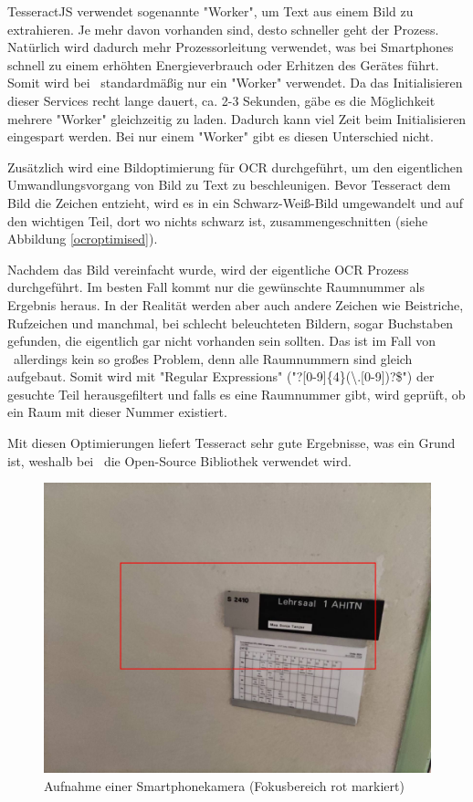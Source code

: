 
TesseractJS verwendet sogenannte "Worker", um Text aus einem Bild zu extrahieren. Je mehr davon vorhanden sind, desto schneller geht der Prozess. Natürlich wird dadurch mehr Prozessorleitung verwendet, was bei Smartphones schnell zu einem erhöhten Energieverbrauch oder Erhitzen des Gerätes führt. Somit wird bei \ZELIA\ standardmäßig nur ein "Worker" verwendet. Da das Initialisieren dieser Services recht lange dauert, ca. 2-3 Sekunden, gäbe es die Möglichkeit mehrere "Worker" gleichzeitig zu laden. Dadurch kann viel Zeit beim Initialisieren eingespart werden. Bei nur einem "Worker" gibt es diesen Unterschied nicht. 

Zusätzlich wird eine Bildoptimierung für OCR durchgeführt, um den eigentlichen Umwandlungsvorgang von Bild zu Text zu beschleunigen. Bevor Tesseract dem Bild die Zeichen entzieht, wird es in ein Schwarz-Weiß-Bild umgewandelt und auf den wichtigen Teil, dort wo nichts schwarz ist, zusammengeschnitten (siehe Abbildung \ref{ocroptimised}).

Nachdem das Bild vereinfacht wurde, wird der eigentliche OCR Prozess durchgeführt. Im besten Fall kommt nur die gewünschte Raumnummer als Ergebnis heraus. In der Realität werden aber auch andere Zeichen wie Beistriche, Rufzeichen und manchmal, bei schlecht beleuchteten Bildern, sogar Buchstaben gefunden, die eigentlich gar nicht vorhanden sein sollten. Das ist im Fall von \ZELIA\ allerdings kein so großes Problem, denn alle Raumnummern sind gleich aufgebaut. Somit wird mit "Regular Expressions" ("{\ttfamily [A-Z]?[0-9]\{4\}(\textbackslash.[0-9])?\$}") der gesuchte Teil herausgefiltert und falls es eine Raumnummer gibt, wird geprüft, ob ein Raum mit dieser Nummer existiert.

Mit diesen Optimierungen liefert Tesseract sehr gute Ergebnisse, was ein Grund ist, weshalb bei \ZELIA\ die Open-Source Bibliothek verwendet wird.


\begin{figure}
    \centering
    \includegraphics[width=120mm]{media/OCR/original}
    \caption{Aufnahme einer Smartphonekamera (Fokusbereich rot markiert)}
    \label{fig:phonecam}
\end{figure}


